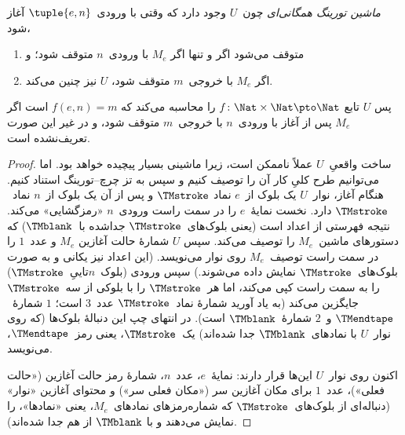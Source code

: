 \documentclass[../../../include/open-logic-section]{subfiles}
\begin{document}
\begin{thm} \emph{ماشین تورینگ همگانی‌ای}
  چون~$U$ وجود دارد که وقتی با ورودی~$\tuple{e,n}$ آغاز شود،
  \begin{enumerate}
    \item متوقف می‌شود اگر و تنها اگر $M_e$ با ورودی~$n$ متوقف شود؛ و
    \item اگر $M_e$ با خروجی~$m$ متوقف شود، $U$ نیز چنین می‌کند.
  \end{enumerate}
  پس $U$ تابع $f\colon\Nat\times\Nat\pto\Nat$ را محاسبه می‌کند که
  $f(e,n)=m$ است اگر $M_e$ پس از آغاز با ورودی~$n$ با خروجی~$m$
  متوقف شود، و در غیر این صورت تعریف‌نشده است.
\end{thm}

\begin{proof}
  ساخت واقعیِ~$U$ عملاً ناممکن است، زیرا ماشینی بسیار پیچیده خواهد
  بود. اما می‌توانیم طرح کلیِ کار آن را توصیف کنیم و سپس به تز
  چرچ--تورینگ استناد کنیم. هنگام آغاز، نوار~$U$ یک بلوک از~$e$ نماد
  $\TMstroke$ و پس از آن یک بلوک از~$n$ نماد~$\TMstroke$ دارد. نخست
  نمایهٔ~$e$ را در سمت راست ورودی~$n$ «رمزگشایی» می‌کند. نتیجه فهرستی
  از اعداد است (یعنی بلوک‌های~$\TMstroke$ جداشده با~$\TMblank$) که
  دستورهای ماشین~$M_e$ را توصیف می‌کند. سپس $U$ شمارهٔ حالت آغازین
  $M_e$ و عدد~$1$ را در سمت راست توصیف~$M_e$ روی نوار می‌نویسد. (این
  اعداد نیز یکانی و به صورت بلوک‌های~$\TMstroke$ نمایش داده می‌شوند.)
  سپس ورودی (بلوک~$n$تاییِ~$\TMstroke$) را به سمت راست کپی می‌کند، اما
  هر~$\TMstroke$ را با بلوکی از سه~$\TMstroke$ جایگزین می‌کند (به یاد
  آورید شمارهٔ نماد~$\TMstroke$ عدد~$3$ است؛ $1$ شمارهٔ~$\TMendtape$
  و~$2$ شمارهٔ~$\TMblank$ است). در انتهای چپ این دنبالهٔ بلوک‌ها (که
  روی نوار~$U$ با نمادهای~$\TMblank$ جدا شده‌اند) یک~$\TMstroke$، یعنی
  رمز~$\TMendtape$، می‌نویسد.

  اکنون روی نوار~$U$ این‌ها قرار دارند: نمایهٔ~$e$، عدد~$n$، شمارهٔ
  رمز حالت آغازین («حالت فعلی»)، عدد~$1$ برای مکان آغازین سر («مکان
  فعلی سر») و محتوای آغازین «نوار» (دنباله‌ای از بلوک‌های~$\TMstroke$
  که شماره‌رمزهای نمادهای~$M_e$، یعنی «نمادها»، را نمایش می‌دهند و با
  $\TMblank$ از هم جدا شده‌اند).


\end{proof}
\end{document}

